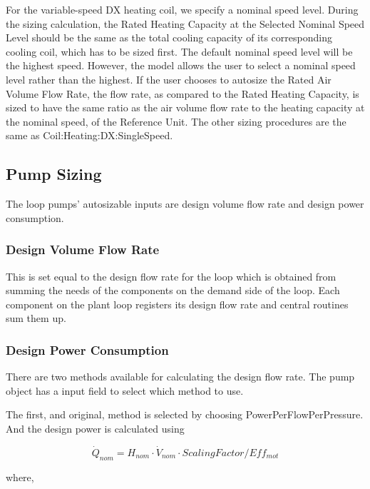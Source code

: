 For the variable-speed DX heating coil, we specify a nominal speed level. During the sizing calculation, the Rated Heating Capacity at the Selected Nominal Speed Level should be the same as the total cooling capacity of its corresponding cooling coil, which has to be sized first. The default nominal speed level will be the highest speed. However, the model allows the user to select a nominal speed level rather than the highest. If the user chooses to autosize the Rated Air Volume Flow Rate, the flow rate, as compared to the Rated Heating Capacity, is sized to have the same ratio as the air volume flow rate to the heating capacity at the nominal speed, of the Reference Unit. The other sizing procedures are the same as Coil:Heating:DX:SingleSpeed.

\subsection{Pump Sizing}\label{pump-sizing}

The loop pumps' autosizable inputs are design volume flow rate and design power consumption.

\subsubsection{Design Volume Flow Rate}\label{design-volume-flow-rate}

This is set equal to the design flow rate for the loop which is obtained from summing the needs of the components on the demand side of the loop. Each component on the plant loop registers its design flow rate and central routines sum them up.

\subsubsection{Design Power Consumption}\label{design-power-consumption}

There are two methods available for calculating the design flow rate. The pump object has a input field to select which method to use.

The first, and original, method is selected by choosing PowerPerFlowPerPressure. And the design power is calculated using

\begin{equation}
\dot Q_{nom} = H_{nom} \cdot \dot V_{nom} \cdot ScalingFactor /Eff_{mot}
\end{equation}

where,

